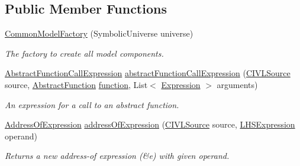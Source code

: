 \subsection*{Public Member Functions}
\begin{DoxyCompactItemize}
\item 
\hyperlink{classedu_1_1udel_1_1cis_1_1vsl_1_1civl_1_1model_1_1common_1_1CommonModelFactory_a2a84120e1603ed93d824588c470ba593}{Common\+Model\+Factory} (Symbolic\+Universe universe)
\begin{DoxyCompactList}\small\item\em The factory to create all model components. \end{DoxyCompactList}\item 
\hyperlink{interfaceedu_1_1udel_1_1cis_1_1vsl_1_1civl_1_1model_1_1IF_1_1expression_1_1AbstractFunctionCallExpression}{Abstract\+Function\+Call\+Expression} \hyperlink{classedu_1_1udel_1_1cis_1_1vsl_1_1civl_1_1model_1_1common_1_1CommonModelFactory_a862d48710f8bea82871f76a080db931b}{abstract\+Function\+Call\+Expression} (\hyperlink{interfaceedu_1_1udel_1_1cis_1_1vsl_1_1civl_1_1model_1_1IF_1_1CIVLSource}{C\+I\+V\+L\+Source} source, \hyperlink{interfaceedu_1_1udel_1_1cis_1_1vsl_1_1civl_1_1model_1_1IF_1_1AbstractFunction}{Abstract\+Function} \hyperlink{classedu_1_1udel_1_1cis_1_1vsl_1_1civl_1_1model_1_1common_1_1CommonModelFactory_a8a7968569d8f0b05aa7ed59dfa5368c7}{function}, List$<$ \hyperlink{interfaceedu_1_1udel_1_1cis_1_1vsl_1_1civl_1_1model_1_1IF_1_1expression_1_1Expression}{Expression} $>$ arguments)
\begin{DoxyCompactList}\small\item\em An expression for a call to an abstract function. \end{DoxyCompactList}\item 
\hyperlink{interfaceedu_1_1udel_1_1cis_1_1vsl_1_1civl_1_1model_1_1IF_1_1expression_1_1AddressOfExpression}{Address\+Of\+Expression} \hyperlink{classedu_1_1udel_1_1cis_1_1vsl_1_1civl_1_1model_1_1common_1_1CommonModelFactory_aabb3e1d45e14eed94bbd6f299b3b33f3}{address\+Of\+Expression} (\hyperlink{interfaceedu_1_1udel_1_1cis_1_1vsl_1_1civl_1_1model_1_1IF_1_1CIVLSource}{C\+I\+V\+L\+Source} source, \hyperlink{interfaceedu_1_1udel_1_1cis_1_1vsl_1_1civl_1_1model_1_1IF_1_1expression_1_1LHSExpression}{L\+H\+S\+Expression} operand)
\begin{DoxyCompactList}\small\item\em Returns a new address-\/of expression {\ttfamily (\&e)} with given operand. \end{DoxyCompactList}\item 

\end{DoxyCompactItemize}
